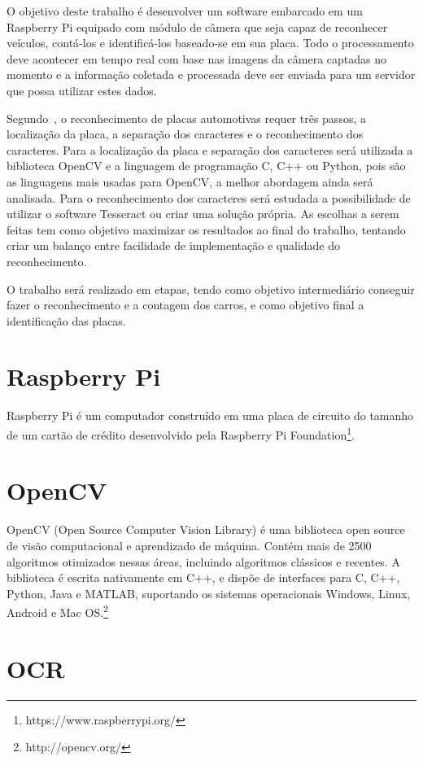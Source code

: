 
O objetivo deste trabalho é desenvolver um software embarcado em um Raspberry Pi
equipado com módulo de câmera que seja capaz de reconhecer veículos, contá-los e
identificá-los baseado-se em sua placa. Todo o processamento deve acontecer em
tempo real com base nas imagens da câmera captadas no momento e a informação
coletada e processada deve ser enviada para um servidor que possa utilizar estes
dados.

Segundo~\cite{ahmad2015automatic}, o reconhecimento de placas automotivas requer
três passos, a localização da placa, a separação dos caracteres e o
reconhecimento dos caracteres. Para a localização da placa e separação dos
caracteres será utilizada a biblioteca OpenCV e a linguagem de programação C,
C++ ou Python, pois são as linguagens mais usadas para OpenCV, a melhor
abordagem ainda será analisada. Para o reconhecimento dos caracteres será
estudada a possibilidade de utilizar o software Tesseract ou criar uma solução
própria. As escolhas a serem feitas tem como objetivo maximizar os resultados ao
final do trabalho, tentando criar um balanço entre facilidade de implementação e
qualidade do reconhecimento.

O trabalho será realizado em etapas, tendo como objetivo intermediário conseguir
fazer o reconhecimento e a contagem dos carros, e como objetivo final a
identificação das placas.

\section{Raspberry Pi}
\label{sec:raspi}

Raspberry Pi é um computador construído em uma placa de circuito do tamanho de
um cartão de crédito desenvolvido pela Raspberry Pi
Foundation\footnote{https://www.raspberrypi.org/}.

\section{OpenCV}
\label{sec:opencv}

OpenCV (Open Source Computer Vision Library) é uma biblioteca open source de
visão computacional e aprendizado de máquina. Contém mais de 2500 algoritmos
otimizados nessas áreas, incluindo algoritmos clássicos e recentes. A biblioteca
é escrita nativamente em C++, e dispõe de interfaces para C, C++, Python, Java e
MATLAB, suportando os sistemas operacionais Windows, Linux, Android e Mac
OS.\footnote{http://opencv.org/}

\section{OCR}
\label{sec:ocr}

